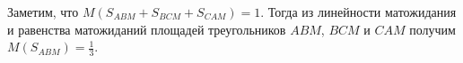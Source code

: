 \documentclass{article}
\begin{document}
Заметим, что $M(S_{ABM} + S_{BCM} + S_{CAM}) = 1$. Тогда из линейности матожидания и равенства матожиданий площадей треугольников $ABM$, $BCM$ и $CAM$ получим $M(S_{ABM}) = \frac13$.
\end{document}
